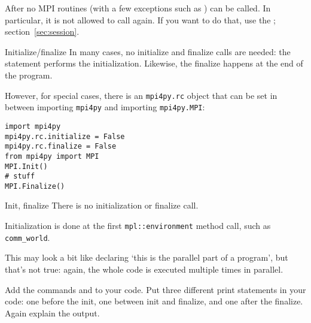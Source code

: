 After  no MPI routines
(with a few exceptions such as )
can be called.
In particular, it is not allowed to call  again.
If you want to do that, use the ; section~\ref{sec:session}.

\begin{pythonnote}{Initialize/finalize}
  In many cases,  no initialize and finalize calls are needed:
  the statement
  performs the initialization.
  Likewise, the finalize happens at the end of the program.

  However, for special cases, there is an \lstinline{mpi4py.rc} object
  that can be set in between importing \lstinline{mpi4py} and
  importing \lstinline{mpi4py.MPI}:
\begin{lstlisting}
import mpi4py
mpi4py.rc.initialize = False
mpi4py.rc.finalize = False
from mpi4py import MPI
MPI.Init()
# stuff
MPI.Finalize()
\end{lstlisting}
\end{pythonnote}

\begin{mplnote}{Init, finalize}
  There is no initialization or finalize call.
  \begin{mplimpl}
    Initialization is done at the first \lstinline+mpl::environment+ method call,
    such as \lstinline+comm_world+.
  \end{mplimpl}

\end{mplnote}

This may look a bit like declaring `this is the parallel part of a
program', but that's not true: again, the whole code is executed
multiple times in parallel.

\begin{exercise}
  \label{ex:hello2}
  Add the commands  and 
  to your code. Put three different print statements in your code: one before the init,
  one between init and finalize, and one after the finalize. Again explain the output.
\end{exercise}



